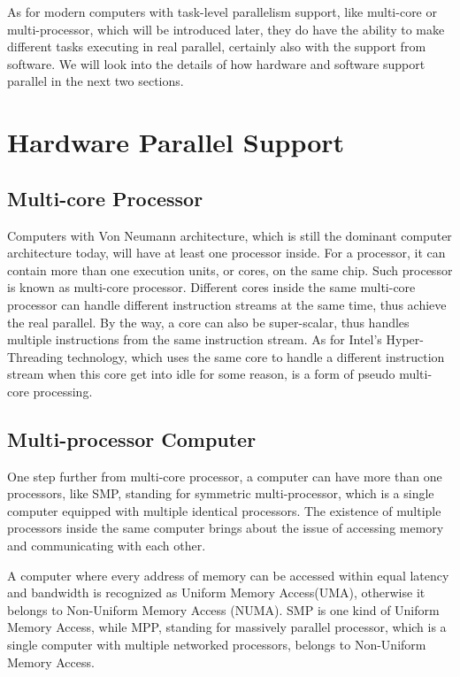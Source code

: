 \documentclass[12pt,a4]{report}
\begin{document}
As for modern computers with task-level parallelism support, like multi-core or multi-processor, which will be introduced later, they do have the ability to make different tasks executing in real parallel, certainly also with the support from software. We will look into the details of how hardware and software support parallel in the next two sections.

\section{Hardware Parallel Support}

\subsection{Multi-core Processor}

Computers with Von Neumann architecture, which is still the dominant computer architecture today, will have at least one processor inside. For a processor, it can contain more than one execution units, or cores, on the same chip. Such processor is known as multi-core processor. Different cores inside the same multi-core processor can handle different instruction streams at the same time, thus achieve the real parallel. By the way, a core can also be super-scalar, thus handles multiple instructions from the same instruction stream. As for Intel's Hyper-Threading technology, which uses the same core to handle a different instruction stream when this core get into idle for some reason, is a form of pseudo multi-core processing.

\subsection{Multi-processor Computer}

One step further from multi-core processor, a computer can have more than one processors, like SMP, standing for symmetric multi-processor, which is a single computer equipped with multiple identical processors. The existence of multiple processors inside the same computer brings about the issue of accessing memory and communicating with each other.

A computer where every address of memory can be accessed within equal latency and bandwidth is recognized as Uniform Memory Access(UMA), otherwise it belongs to Non-Uniform Memory Access (NUMA). SMP is one kind of Uniform Memory Access, while MPP, standing for massively parallel processor, which is a single computer with multiple networked processors, belongs to Non-Uniform Memory Access.
\end{document}
